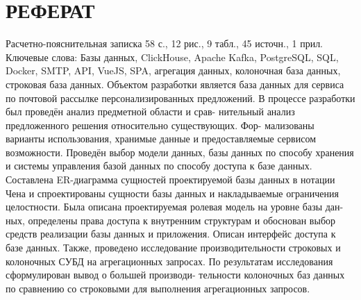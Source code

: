 \chapter*{РЕФЕРАТ}

Расчетно-пояснительная записка 58 с., 12 рис., 9 табл., 45 источн., 1 прил.
Ключевые слова: Базы данных, ClickHouse, Apache Kafka, PostgreSQL,
SQL, Docker, SMTP, API, VueJS, SPA, агрегация данных, колоночная база данных,
строковая база данных.
Объектом разработки является база данных для сервиса по почтовой
рассылке персонализированных предложений.
В процессе разработки был проведён анализ предметной области и срав-
нительный анализ предложенного решения относительно существующих. Фор-
мализованы варианты использования, хранимые данные и предоставляемые
сервисом возможности. Проведён выбор модели данных, базы данных по способу
хранения и системы управления базой данных по способу доступа к базе данных.
Составлена ER-диаграмма сущностей проектируемой базы данных в нотации
Чена и спроектированы сущности базы данных и накладываемые ограничения
целостности. Была описана проектируемая ролевая модель на уровне базы дан-
ных, определены права доступа к внутренним структурам и обоснован выбор
средств реализации базы данных и приложения. Описан интерфейс доступа к
базе данных. Также, проведено исследование производительности строковых и
колоночных СУБД на агрегационных запросах.
По результатам исследования сформулирован вывод о большей производи-
тельности колоночных баз данных по сравнению со строковыми для выполнения
агрегационных запросов.